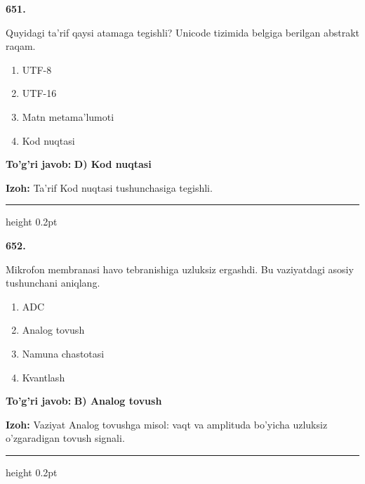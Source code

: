 \documentclass[10pt,a4paper,oneside]{article}
\begin{document}
\noindent\textbf{\color{ink}651.}
\par
Quyidagi ta'rif qaysi atamaga tegishli? Unicode tizimida belgiga berilgan abstrakt raqam.
\begin{enumerate}[label=\Alph*),leftmargin=9mm]
\item UTF-8
\item UTF-16
\item Matn metama'lumoti
\item Kod nuqtasi
\end{enumerate}
\begin{tcolorbox}[enhanced,breakable,colback=teal!4,colframe=teal!50!black,boxrule=0.5pt,arc=1.1mm,left=3mm,right=3mm,top=1.7mm,bottom=1.7mm,before skip=2mm,after skip=2mm]
\textbf{\color{teal}To'g'ri javob:} \textbf{D) Kod nuqtasi}
\par\smallskip
\textbf{Izoh:} Ta'rif Kod nuqtasi tushunchasiga tegishli.
\end{tcolorbox}
\vspace{2mm}\hrule height 0.2pt \vspace{3mm}

\noindent\textbf{\color{ink}652.}
\par
Mikrofon membranasi havo tebranishiga uzluksiz ergashdi. Bu vaziyatdagi asosiy tushunchani aniqlang.
\begin{enumerate}[label=\Alph*),leftmargin=9mm]
\item ADC
\item Analog tovush
\item Namuna chastotasi
\item Kvantlash
\end{enumerate}
\begin{tcolorbox}[enhanced,breakable,colback=teal!4,colframe=teal!50!black,boxrule=0.5pt,arc=1.1mm,left=3mm,right=3mm,top=1.7mm,bottom=1.7mm,before skip=2mm,after skip=2mm]
\textbf{\color{teal}To'g'ri javob:} \textbf{B) Analog tovush}
\par\smallskip
\textbf{Izoh:} Vaziyat Analog tovushga misol: vaqt va amplituda bo'yicha uzluksiz o'zgaradigan tovush signali.
\end{tcolorbox}
\vspace{2mm}\hrule height 0.2pt \vspace{3mm}
\end{document}

